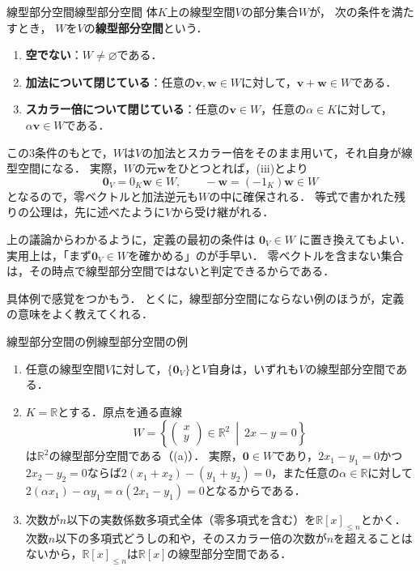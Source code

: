 \begin{definition}{線型部分空間}{線型部分空間}
  体$K$上の線型空間$V$の部分集合$W$が，
  次の条件を満たすとき，
  $W$を$V$の\textbf{線型部分空間}という．
  \begin{enumerate}[label=(\roman*),leftmargin=3.2em]
    \item \textbf{空でない}：$W\neq\varnothing$である．
    \item \textbf{加法について閉じている}：任意の$\bm{v},\bm{w}\in W$に対して，$\bm{v}+\bm{w}\in W$である．
    \item \textbf{スカラー倍について閉じている}：任意の$\bm{v}\in W$，任意の$\alpha\in K$に対して，$\alpha \bm{v}\in W$である．
  \end{enumerate}
\end{definition}

この$3$条件のもとで，$W$は$V$の加法とスカラー倍をそのまま用いて，それ自身が線型空間になる．
実際，$W$の元$\bm{w}$をひとつとれば，(iii)とより
\[
  \bm{0}_V = 0_K\bm{w}\in W,
  \qquad
  -\bm{w}=(-1_K)\bm{w}\in W
\]
となるので，零ベクトルと加法逆元も$W$の中に確保される．
等式で書かれた残りの公理は，先に述べたように$V$から受け継がれる．

\begin{remark}[空でないことと零ベクトル]
上の議論からわかるように，定義の最初の条件は
$\bm{0}_V\in W$
に置き換えてもよい．
実用上は，「まず$\bm{0}_V\in W$を確かめる」のが手早い．
零ベクトルを含まない集合は，その時点で線型部分空間ではないと判定できるからである．
\end{remark}

具体例で感覚をつかもう．
とくに，線型部分空間にならない例のほうが，定義の意味をよく教えてくれる．

\begin{example}{線型部分空間の例}{線型部分空間の例}
  \begin{enumerate}[label=(\arabic*),leftmargin=3.2em]
    \item 任意の線型空間$V$に対して，$\{\bm{0}_V\}$と$V$自身は，いずれも$V$の線型部分空間である．
    \item $K = \mathbb{R}$とする．原点を通る直線
      \[
        W = \left\{ \begin{pmatrix} x \\ y \end{pmatrix} \in \mathbb{R}^2 ~\middle|~ 2x - y = 0 \right\}
      \]
      は$\mathbb{R}^2$の線型部分空間である（(a)）．
      実際，$\bm{0} \in W$であり，$2x_1 - y_1 = 0$かつ$2x_2 - y_2 = 0$ならば$2(x_1 + x_2) - (y_1 + y_2) = 0$，また任意の$\alpha \in \mathbb{R}$に対して$2(\alpha x_1) - \alpha y_1 = \alpha(2x_1 - y_1) = 0$となるからである．
    \item 次数が$n$以下の実数係数多項式全体（零多項式を含む）を$\mathbb{R}[x]_{\le n}$とかく．
      次数$n$以下の多項式どうしの和や，そのスカラー倍の次数が$n$を超えることはないから，$\mathbb{R}[x]_{\le n}$は$\mathbb{R}[x]$の線型部分空間である．
  \end{enumerate}
\end{example}

